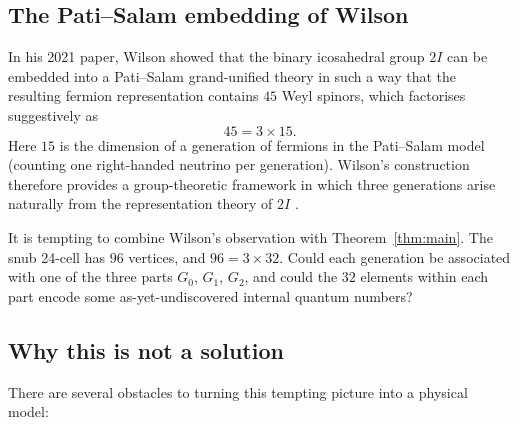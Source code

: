 \documentclass[10pt,reqno]{amsart}
\theoremstyle{plain}
\theoremstyle{definition}
\begin{document}
\subsection{The Pati--Salam embedding of Wilson}

In his 2021 paper, Wilson showed that the binary icosahedral group $2I$ can be embedded into a Pati--Salam grand-unified theory in such a way that the resulting fermion representation contains $45$ Weyl spinors, which factorises suggestively as
\begin{equation}
45 = 3 \times 15.
\end{equation}
Here $15$ is the dimension of a generation of fermions in the Pati--Salam model (counting one right-handed neutrino per generation). Wilson's construction therefore provides a group-theoretic framework in which three generations arise naturally from the representation theory of $2I$ \cite{Wilson2021}.

It is tempting to combine Wilson's observation with Theorem~\ref{thm:main}. The snub 24-cell has $96$ vertices, and $96 = 3 \times 32$. Could each generation be associated with one of the three parts $G_0$, $G_1$, $G_2$, and could the $32$ elements within each part encode some as-yet-undiscovered internal quantum numbers?

\subsection{Why this is not a solution}

There are several obstacles to turning this tempting picture into a physical model:
\end{document}
